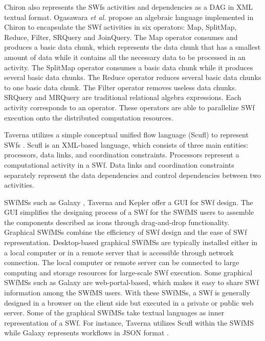 Chiron \cite{Ogasawara2013} also represents the SWfs activities and dependencies as a DAG in XML textual format. 
Ogasawara \textit{et al.} \cite{Ogasawara2011}
propose an algebraic language implemented in Chiron to encapsulate the
SWf activities in six operators: Map, SplitMap, Reduce, Filter,
SRQuery and JoinQuery. The Map operator consumes and produces a basic
data chunk, which represents the data chunk that has a smallest amount of data while it contains all the necessary data 
to be processed in an activity. The SplitMap operator consumes a basic data chunk while it produces several basic
data chunks. The Reduce operator reduces several basic data chunks
to one basic data chunk. The Filter operator removes useless data chunks. SRQuery and MRQuery are traditional relational algebra expressions.
Each activity corresponds to an operator. These operators
are able to parallelize SWf execution onto the distributed computation resources.

Taverna utilizes a simple conceptual unified
flow language (Scufl) to represent SWfs \cite{Oinn2004}.
Scufl is an XML-based language, which consists of three main entities:
processors, data links, and coordination constraints. Processors represent
a computational activity in a SWf. Data links and
coordination constraints separately represent the data dependencies
and control dependencies between two activities. 

SWfMSs such as Galaxy \cite{Goecks2010}, Taverna \cite{Oinn2004}
and Kepler \cite{Altintas2004} offer a GUI for
SWf design. The GUI simplifies the designing
process of a SWf for the SWfMS users to assemble the components described as icons through drag-and-drop functionality. Graphical SWfMSs combine
the efficiency of SWf design and the ease of SWf representation. 
Desktop-based graphical SWfMSs are
typically installed either in a local computer or in a remote server that is accessible through network connection. The local computer or remote server can be connected to large computing and storage resources for large-scale SWf execution.
Some graphical SWfMSs such as Galaxy
are web-portal-based, which makes it easy to
share SWf information among the SWfMS users. 
With these SWfMSs, a SWf is generally designed in a browser on the client side but
executed in a private or public web server. Some of the graphical
SWfMSs take textual languages as inner representation of a SWf. For instance, Taverna utilizes Scufl within the SWfMS while Galaxy represents workflows in JSON format \cite{Abouelhoda2012}. 


